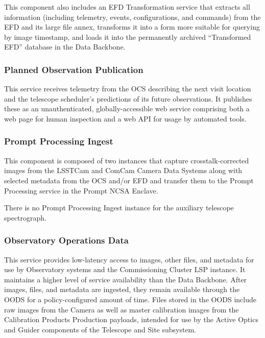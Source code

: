 \documentclass[DM,toc]{lsstdoc}
\begin{document}
This component also includes an EFD Transformation service that extracts
all information (including telemetry, events, configurations, and
commands) from the EFD and its large file annex, transforms it into a
form more suitable for querying by image timestamp, and loads it into
the permanently archived ``Transformed EFD'' database in the Data
Backbone.

\subsubsection{Planned Observation Publication}\label{planned-observation-publication}

This service receives telemetry from the OCS describing the next visit location and the telescope scheduler's predictions of its future observations.
It publishes these as an unauthenticated, globally-accessible web service comprising both a web page for human inspection and a web API for usage by automated tools.

\subsubsection{Prompt Processing Ingest}\label{prompt-processing-ingest}

This component is composed of two instances that capture
crosstalk-corrected images from the LSSTCam and ComCam Camera Data
Systems along with selected metadata from the OCS and/or EFD and
transfer them to the Prompt Processing service in the Prompt NCSA Enclave.

There is no Prompt Processing Ingest instance for the auxiliary
telescope spectrograph.

\subsubsection{Observatory Operations Data}\label{obs-ops-data}

This service provides low-latency access to images, other files, and metadata for use by Observatory systems and the Commissioning Cluster LSP instance.
It maintains a higher level of service availability than the Data Backbone.
After images, files, and metadata are ingested, they remain available through the OODS for a policy-configured amount of time.
Files stored in the OODS include raw images from the Camera as well as master calibration images from the Calibration Products Production payloads, intended for use by the Active Optics and Guider components of the Telescope and Site subsystem.
\end{document}
